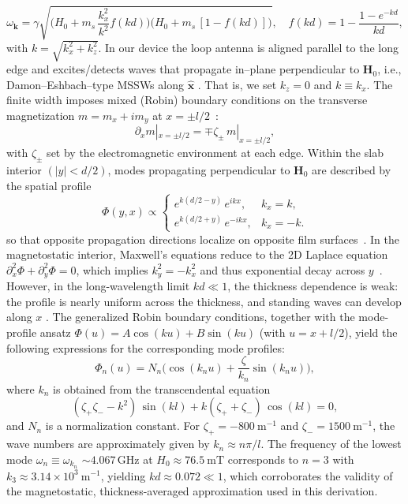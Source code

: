 \documentclass[
twocolumn,

superscriptaddress,









 amsmath,amssymb,
 aps,


prl,




]{revtex4-2}
\begin{document}
\begin{equation}
\omega_{\mathbf k}=\gamma\sqrt{\Big(H_0+m_s\,\frac{k_x^2}{k^2}f(kd)\Big)
\Big(H_0+m_s\,[1-f(kd)]\Big)} ,
\quad f(kd)=1-\frac{1-e^{-kd}}{kd},
\end{equation}
with $k=\sqrt{k_x^2+k_z^2}$. In our device the loop antenna is aligned parallel to the long edge and excites/detects waves that propagate in–plane perpendicular to $\mathbf H_0$, i.e., Damon–Eshbach–type MSSWs along $\hat{\mathbf x}$ \cite{eshbach1960surface}. That is, we set $k_z=0$ and $k \equiv k_x$. The finite width imposes mixed (Robin) boundary conditions on the transverse
magnetization $m=m_x+im_y$
at $x=\pm l/2$~\cite{jackson2021classical}:
\begin{equation}
\partial_x m|_{x=\pm l/2}=\mp {\zeta_\pm}\,m|_{x=\pm l/2},
\end{equation}
with $\zeta_\pm$ set by the electromagnetic environment at each edge. Within the slab interior \((|y|<d/2)\), modes propagating perpendicular to \(\mathbf{H}_0\) are described by the spatial profile
\begin{equation}
\Phi(y,x)\propto
\begin{cases}
e^{k(d/2-y)} \,e^{i k x}, & k_x=k,\\[3pt]
e^{k(d/2+y)}\,e^{-i k x}, & k_x=-k.
\end{cases}  \label{eq_s8}
\end{equation}
so that opposite propagation directions localize on opposite film surfaces~\cite{eshbach1960surface}. In the magnetostatic interior, Maxwell’s equations reduce to the 2D Laplace equation \(\partial_x^2\Phi+\partial_y^2\Phi=0\), which implies \(k_y^2=-k_x^2\) and thus exponential decay across \(y\)~\cite{hurben1995theory}. However, in the long-wavelength limit \(kd\ll1\), the thickness dependence is weak: the profile is nearly uniform across the thickness, and standing waves can develop along \(x\) \cite{hurben1995theory}.
 The generalized Robin boundary conditions, together with the mode-profile ansatz
$\Phi(u) = A\cos(ku) + B\sin(ku)$ (with $u = x + l/2$), yield the following expressions
for the corresponding mode profiles:
\begin{equation}
\Phi_n(u)=N_n\big(\cos(k_nu)+\frac{\zeta}{k_n}\sin(k_nu)\big), \label{eq_s10}
\end{equation}
where $k_n$  is obtained from the transcendental equation
\begin{equation}
    (\zeta_{+}\zeta_{-}-k^{2})\,\sin(kl)+k(\zeta_{+}+\zeta_{-})\,\cos(kl)=0,
\end{equation}
and $N_n$ is a normalization constant. For $\zeta_+ = -800~\mathrm{m^{-1}}$ and $\zeta_- = 1500~\mathrm{m^{-1}}$,
the wave numbers are approximately given by $k_n \approx n\pi / l$. The frequency of the lowest mode $\omega_n\equiv\omega_{k_n}$ $\sim 4.067\,\mathrm{GHz}$ at \(H_0 \approx 76.5~\mathrm{mT}\) corresponds to \(n=3\) with \(k_3 \approx 3.14\times10^{3}~\mathrm{m^{-1}}\), yielding \(kd \approx 0.072 \ll 1\), which corroborates the validity of the magnetostatic, thickness-averaged approximation used in this derivation.
\end{document}
